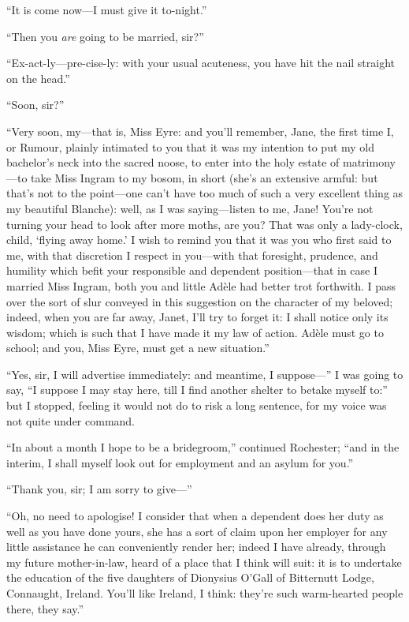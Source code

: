 \enquote{It is come now---I must give it to-night.}

\enquote{Then you \emph{are} going to be married, sir?}

\enquote{Ex-act-ly---pre-cise-ly: with your usual acuteness, you have
	hit the nail straight on the head.}

\enquote{Soon, sir?}

\enquote{Very soon, my---that is, Miss Eyre: and you'll remember, Jane,
	the first time I, or Rumour, plainly intimated to you that it was my
	intention to put my old bachelor's neck into the sacred noose, to enter
	into the holy estate of matrimony---to take Miss Ingram to my bosom, in
	short (she's an extensive armful: but that's not to the point---one
	can't have too much of such a very excellent thing as my beautiful
	Blanche): well, as I was saying---listen to me, Jane! You're not
	turning your head to look after more moths, are you? That was only a
	lady-clock, child, \enquote{flying away home.} I wish to remind you
	that it was you who first said to me, with that discretion I respect in
	you---with that foresight, prudence, and humility which befit your
	responsible and dependent position---that in case I married Miss Ingram,
	both you and little Adèle had better trot forthwith. I pass over the
	sort of slur conveyed in this suggestion on the character of my beloved;
	indeed, when you are far away, Janet, I'll try to forget it: I shall
	notice only its wisdom; which is such that I have made it my law of
	action. Adèle must go to school; and you, Miss Eyre, must get a new
	situation.}

\enquote{Yes, sir, I will advertise immediately: and meantime, I
	suppose---} I was going to say, \enquote{I suppose I may stay here, till
	I find another shelter to betake myself to:} but I stopped, feeling it
would not do to risk a long sentence, for my voice was not quite under
command.

\enquote{In about a month I hope to be a bridegroom,} continued \Mr{}
Rochester; \enquote{and in the interim, I shall myself look out for
	employment and an asylum for you.}

\enquote{Thank you, sir; I am sorry to give---}

\enquote{Oh, no need to apologise! I consider that when a dependent
	does her duty as well as you have done yours, she has a sort of claim
	upon her employer for any little assistance he can conveniently render
	her; indeed I have already, through my future mother-in-law, heard of a
	place that I think will suit: it is to undertake the education of the
	five daughters of \Mrs{} Dionysius O'Gall of Bitternutt Lodge, Connaught,
	Ireland. You'll like Ireland, I think: they're such warm-hearted people
	there, they say.}

